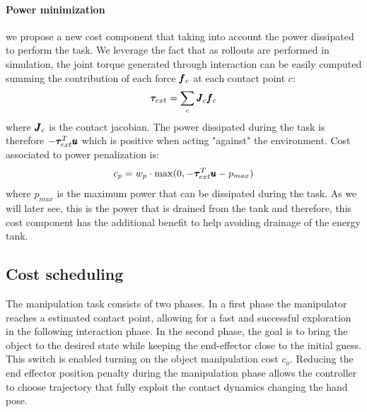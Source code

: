 \paragraph{Power minimization} we propose a new cost component that taking into account the power dissipated to perform the task. We leverage the fact that as rollouts are performed in simulation, the joint torque generated through interaction can be easily computed summing the contribution of each force $\pmb{f}_c$ at each contact point $c$:
\begin{equation}
\boldsymbol{\tau}_{ext} = \sum\limits_{c} \pmb{J}_c \pmb{f}_c    
\end{equation}
where $\pmb{J}_c$ is the contact jacobian. The power dissipated during the task is therefore $-\boldsymbol{\tau}_{ext}^T\pmb{u}$ which is positive when acting "against" the environment. Cost associated to power penalization is:
\begin{equation}
   c_p = w_{p} \cdot \max(0, - \boldsymbol{\tau}_{ext}^T\pmb{u} - p_{max})      
 \end{equation}
where $p_{max}$ is the maximum power that can be dissipated during the task.
As we will later see, this is the power that is drained from the tank and therefore, this cost component has the additional benefit to help avoiding drainage of the energy tank.
 
\subsection{Cost scheduling}
The manipulation task consists of two phases. In a first phase the manipulator reaches a estimated contact point, allowing for a fast and successful exploration in the following interaction phase. In the second phase, the goal is to bring the object to the desired state while keeping the end-effector close to the initial guess. This switch is enabled turning on the object manipulation cost $c_o$. Reducing the end effector position penalty during the manipulation phase allows the controller to choose trajectory that fully exploit the contact dynamics changing the hand pose. 


